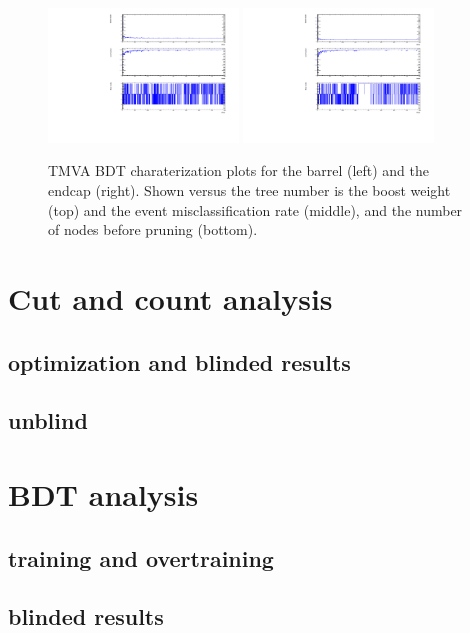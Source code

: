 \documentclass[10pt,a4paper]{article}
\begin{document}
\begin{figure}
  \centering
  \includegraphics[width=0.45\textwidth]{Figures/BDTControlPlots_barrel}
  \includegraphics[width=0.45\textwidth]{Figures/BDTControlPlots_endcaps}
  \caption{TMVA BDT charaterization plots for the barrel (left) and the endcap (right). Shown versus the tree number is the boost weight (top) and the event misclassification rate (middle), and the number of nodes before pruning (bottom).}
  \label{fig:BDTControlPlots}
\end{figure}



\clearpage
\section{Cut and count analysis}
\subsection{optimization and blinded results}
\subsection{unblind}

\section{BDT analysis}
\subsection{training and overtraining}
\subsection{blinded results}
\end{document}

